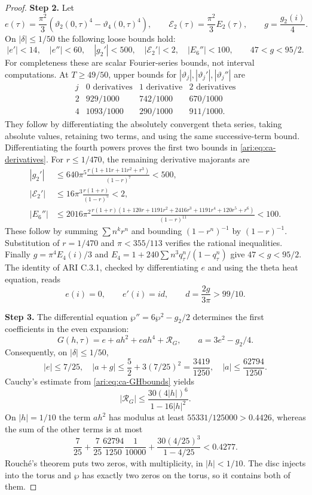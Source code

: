 \documentclass[11pt,a4paper]{article}
\theoremstyle{plain}
\theoremstyle{definition}
\begin{document}
\begin{proof}
\noindent\textbf{Step 2.} Let
\[
 e(\tau)=\frac{\pi^2}{3}(\vartheta_2(0,\tau)^4-
                              \vartheta_4(0,\tau)^4),\qquad
 \mathcal E_2(\tau)=\frac{\pi^2}{3}E_2(\tau),\qquad
 g=\frac{g_2(i)}4.
\]
On $|\delta|\le1/50$ the following loose bounds hold:
\begin{equation}\label{ari:eq:ca-derivatives}
 |e'|<14,\quad |e''|<60,\quad |g_2'|<500,
 \quad |\mathcal E_2'|<2,\quad |E_6''|<100,
 \qquad 47<g<95/2.
\end{equation}
For completeness these are scalar Fourier-series bounds, not
interval computations. At $T\ge49/50$, upper bounds for
$|\vartheta_j|,|\vartheta_j'|,|\vartheta_j''|$ are
\[
\begin{array}{c|ccc}
j&0\text{ derivatives}&1\text{ derivative}&2\text{ derivatives}\\ \hline
2&929/1000&742/1000&670/1000\\
4&1093/1000&290/1000&911/1000.
\end{array}
\]
They follow by differentiating the absolutely convergent theta
series, taking absolute values, retaining two terms, and using
the same successive-term bound. Differentiating the fourth
powers proves the first two bounds in \eqref{ari:eq:ca-derivatives}.
For $r\le1/470$, the remaining derivative majorants are
\begin{align*}
 |g_2'|&\le640\pi^5\frac{r(1+11r+11r^2+r^3)}{(1-r)^7}<500,\\
 |\mathcal E_2'|&\le16\pi^3\frac{r(1+r)}{(1-r)^5}<2,\\
 |E_6''|&\le2016\pi^2
 \frac{r(1+r)(1+120r+1191r^2+2416r^3+1191r^4+120r^5+r^6)}
 {(1-r)^{11}}<100.
\end{align*}
These follow by summing $\sum n^k r^n$ and bounding
$(1-r^n)^{-1}$ by $(1-r)^{-1}$. Substitution of $r=1/470$
and $\pi<355/113$ verifies the rational inequalities.
Finally $g=\pi^4E_4(i)/3$ and
$E_4=1+240\sum n^3q_\tau^n/(1-q_\tau^n)$ give $47<g<95/2$.
The identity of ARI C.3.1, checked by differentiating $e$ and using
the theta heat equation, reads
\[
 e(i)=0,\qquad e'(i)=id,\qquad d=\frac{2g}{3\pi}>99/10.
\]


\noindent\textbf{Step 3.} The differential equation $\wp''=6\wp^2-g_2/2$ determines the
first coefficients in the even expansion:
\[
 G(h,\tau)=e+a h^2+ea h^4+\mathcal R_G,
 \qquad a=3e^2-g_2/4.
\]
Consequently, on $|\delta|\le1/50$,
\[
 |e|\le7/25,\quad |a+g|\le\frac52+3(7/25)^2=\frac{3419}{1250},
 \quad |a|\le\frac{62794}{1250}.
\]
Cauchy's estimate from \eqref{ari:eq:ca-GHbounds} yields
\[
 |\mathcal R_G|\le
 \frac{30(4|h|)^6}{1-16|h|^2}.
\]
On $|h|=1/10$ the term $ah^2$ has modulus at least
$55331/125000>0.4426$, whereas the sum of the other terms is at most
\[
 \frac7{25}+\frac7{25}\frac{62794}{1250}\frac1{10000}
       +\frac{30(4/25)^3}{1-4/25}<0.4277.
\]
Rouch\'e's theorem puts two zeros, with multiplicity, in
$|h|<1/10$. The disc injects into the torus and $\wp$ has exactly
two zeros on the torus, so it contains both of them.



\end{proof}
\end{document}
